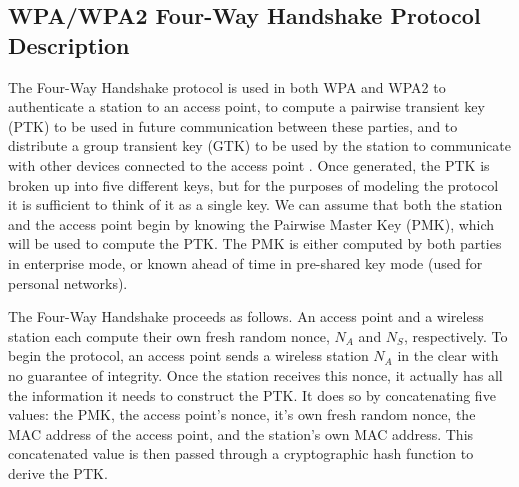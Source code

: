 \documentclass[11pt, twocolumn]{article} %
\begin{document}
{%

\subsection{WPA/WPA2 Four-Way Handshake Protocol Description}
\label{sec:WPA Desc}
The Four-Way Handshake protocol is used in both WPA and WPA2 to authenticate a station to an access point, to compute a pairwise transient key (PTK) to be used in future communication between these parties, and to distribute a group transient key (GTK) to be used by the station to communicate with other devices connected to the access point \cite{liu08}.  Once generated, the PTK is broken up into five different keys, but for the purposes of modeling the protocol it is sufficient to think of it as a single key.  We can assume that both the station and the access point begin by knowing the Pairwise Master Key (PMK), which will be used to compute the PTK.  The PMK is either computed by both parties in enterprise mode, or known ahead of time in pre-shared key mode (used for personal networks).

The Four-Way Handshake proceeds as follows.  An access point and a wireless station each compute their own fresh random nonce, $N_A$ and $N_S$, respectively.  To begin the protocol, an access point sends a wireless station $N_A$ in the clear with no guarantee of integrity.  Once the station receives this nonce, it actually has all the information it needs to construct the PTK.  It does so by concatenating five values: the PMK, the access point's nonce, it's own fresh random nonce, the MAC address of the access point, and the station's own MAC address.  This concatenated value is then passed through a cryptographic hash function to derive the PTK.  

}
\end{document}
